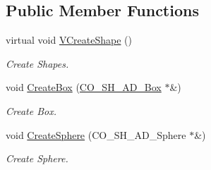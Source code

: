 \subsection*{Public Member Functions}
\begin{DoxyCompactItemize}
\item 
\hypertarget{classContent_1_1Actor_1_1Admin_1_1RigidActor_ae622e85f0661f47b97664a15e610d7e4}{
virtual void \hyperlink{classContent_1_1Actor_1_1Admin_1_1RigidActor_ae622e85f0661f47b97664a15e610d7e4}{VCreateShape} ()}
\label{classContent_1_1Actor_1_1Admin_1_1RigidActor_ae622e85f0661f47b97664a15e610d7e4}

\begin{DoxyCompactList}\small\item\em Create Shapes. \item\end{DoxyCompactList}\item 
\hypertarget{classContent_1_1Actor_1_1Admin_1_1RigidActor_a38c16d66c5e841d20b56f238530d6956}{
void \hyperlink{classContent_1_1Actor_1_1Admin_1_1RigidActor_a38c16d66c5e841d20b56f238530d6956}{CreateBox} (\hyperlink{classContent_1_1Shape_1_1Admin_1_1Box}{CO\_\-SH\_\-AD\_\-Box} $\ast$\&)}
\label{classContent_1_1Actor_1_1Admin_1_1RigidActor_a38c16d66c5e841d20b56f238530d6956}

\begin{DoxyCompactList}\small\item\em Create Box. \item\end{DoxyCompactList}\item 
\hypertarget{classContent_1_1Actor_1_1Admin_1_1RigidActor_af27dda4e50d018849fb63fbf4a56c82b}{
void \hyperlink{classContent_1_1Actor_1_1Admin_1_1RigidActor_af27dda4e50d018849fb63fbf4a56c82b}{CreateSphere} (CO\_\-SH\_\-AD\_\-Sphere $\ast$\&)}
\label{classContent_1_1Actor_1_1Admin_1_1RigidActor_af27dda4e50d018849fb63fbf4a56c82b}

\begin{DoxyCompactList}\small\item\em Create Sphere. \item\end{DoxyCompactList}\end{DoxyCompactItemize}

